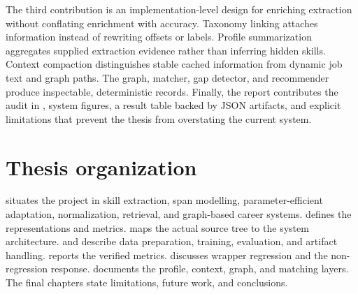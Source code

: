 The third contribution is an implementation-level design for enriching extraction without conflating enrichment with accuracy. Taxonomy linking attaches information instead of rewriting offsets or labels. Profile summarization aggregates supplied extraction evidence rather than inferring hidden skills. Context compaction distinguishes stable cached information from dynamic job text and graph paths. The graph, matcher, gap detector, and recommender produce inspectable, deterministic records. Finally, the report contributes the audit in , system figures, a result table backed by JSON artifacts, and explicit limitations that prevent the thesis from overstating the current system.

\section{Thesis organization}

 situates the project in skill extraction, span modelling, parameter-efficient adaptation, normalization, retrieval, and graph-based career systems.  defines the representations and metrics.  maps the actual source tree to the system architecture.  and  describe data preparation, training, evaluation, and artifact handling.  reports the verified metrics.  discusses wrapper regression and the non-regression response.  documents the profile, context, graph, and matching layers. The final chapters state limitations, future work, and conclusions.
